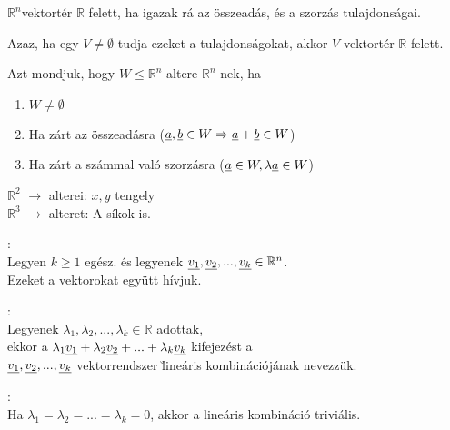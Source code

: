 	\begin{frame}
		 \begin{tcolorbox}[title={Def.: Vektortér}]
			$\mathbb{R}^n$vektortér $\mathbb{R}$ felett, ha igazak rá az összeadás, és a szorzás tulajdonságai.\\

			\mmedskip
			
			Azaz, ha egy $V \neq \emptyset$ tudja ezeket a tulajdonságokat, akkor $V$ vektortér $\mathbb{R}$ felett.			
		\end{tcolorbox}
		
		\begin{tcolorbox}[title={Def.: Altér}]
			Azt mondjuk, hogy $W \leq \mathbb{R}^n$ altere $\mathbb{R}^n$-nek, ha
			\begin{enumerate}
				\item $W \neq \emptyset$
				\item Ha zárt az összeadásra ($\underline{a}, \underline{b} \in W \Rightarrow \underline{a} + \underline{b} \in W$)
				\item Ha zárt a számmal való szorzásra ($\underline{a} \in W, {\lambda}\underline{a} \in W$)
			\end{enumerate}
		\end{tcolorbox}
		
		\begin{tcolorbox}[title={Megj}]
			$\mathbb{R}^2$ $\rightarrow$ alterei: $x, y$ tengely\\
			$\mathbb{R}^3$ $\rightarrow$ alteret: A síkok is.
		\end{tcolorbox}
		
		\begin{tcolorbox}[title={Def.: Vektorrendszer, Lineáris kombináció}]
			:\\
			Legyen $k \geq 1$ egész. és legyenek $\underline{v_1}, \underline{v_2}, ..., \underline{v_k} \in \mathbb{R}^n$.\\
			Ezeket a vektorokat együtt  hívjuk.\\			
			\msmallskip
			
			:\\
			Legyenek ${\lambda}_1, {\lambda}_2, ..., {\lambda}_k \in \mathbb{R}$ adottak,\\
			ekkor a ${\lambda}_1\underline{v_1} + {\lambda}_2\underline{v_2} + ... + {\lambda}_k\underline{v_k}$ kifejezést a\\
			$\underline{v_1}, \underline{v_2}, ..., \underline{v_k}$ vektorrendszer \u{lineáris kombinációjának} nevezzük.\\
			\msmallskip			
			
			:\\
			Ha ${\lambda}_1 = {\lambda}_2 = ... = {\lambda}_k = 0$, akkor a lineáris kombináció triviális.
		\end{tcolorbox}
	\end{frame}

